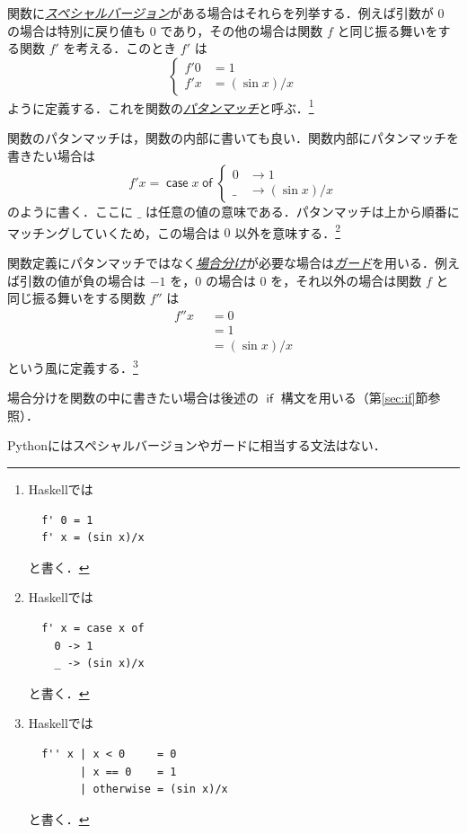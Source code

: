 \documentclass[a4paper]{jsbook}
\newcommand{\programminglanguage}[1]{\textsf{#1}}
\newcommand{\haskell}{\programminglanguage{Haskell}}
\newcommand{\python}{\programminglanguage{Python}}
\newcommand{\keyword}[1]{{\underline{\emph{#1}}}}
\newcommand{\mKeyword}[1]{\mathsf{#1}}
\newcommand{\mIfKeyword}{\mKeyword{if}}
\newcommand{\mCaseKeyword}{\mKeyword{case}}
\newcommand{\mOfKeyword}{\mKeyword{of}}
\newcommand{\mAnyParameter}{\_}
\newcommand{\mGuard}[1]{\mathop{\mid_{#1}}}
\DeclareMathOperator{\mIf}{\mIfKeyword}
\DeclareMathOperator{\mCase}{\mCaseKeyword} %
\DeclareMathOperator{\mOf}{\mOfKeyword} %
\newcommand{\mCaseOf}[1]{\mCase{#1}\mOf}
\newcommand{\mathKeyword}[1]{\operatorname{\textsf{#1}}}
\newcommand{\mathOtherwise}{\mathKeyword{otherwise}}
\begin{document}
関数に\keyword{スペシャルバージョン}がある場合はそれらを列挙する．例えば引数が $0$ の場合は特別に戻り値も $0$ であり，その他の場合は関数 $f$ と同じ振る舞いをする関数 $f'$ を考える．このとき $f'$ は
\begin{equation}
\left\{
\begin{split}
f'0&=1\\
f'x&=(\sin x)/x
\end{split}
\right.
\end{equation}
ように定義する．これを関数の\keyword{パタンマッチ}と呼ぶ．\footnote{\haskell では
\begin{verbatim}
  f' 0 = 1
  f' x = (sin x)/x
\end{verbatim}
と書く．}

関数のパタンマッチは，関数の内部に書いても良い．関数内部にパタンマッチを書きたい場合は
\begin{equation}
f'x=\mCaseOf{x}\left\{
\begin{split}
0&\rightarrow1\\
\mAnyParameter&\rightarrow(\sin x)/x
\end{split}
\right.
\end{equation}
のように書く．ここに $\mAnyParameter$ は任意の値の意味である．パタンマッチは上から順番にマッチングしていくため，この場合は $0$ 以外を意味する．\footnote{\haskell では
\begin{verbatim}
  f' x = case x of
    0 -> 1
    _ -> (sin x)/x
\end{verbatim}
と書く．}

関数定義にパタンマッチではなく\keyword{場合分け}が必要な場合は\keyword{ガード}を用いる．例えば引数の値が負の場合は $-1$ を，$0$ の場合は $0$ を，それ以外の場合は関数 $f$ と同じ振る舞いをする関数 $f''$ は
\begin{equation}
\begin{split}
f''x&\mGuard{x<0}=0\\
&\mGuard{x\equiv 0}=1\\
&\mGuard{\mathOtherwise}=(\sin x)/x
\end{split}
\end{equation}
という風に定義する．\footnote{\haskell では
\begin{verbatim}
  f'' x | x < 0     = 0
        | x == 0    = 1
        | otherwise = (sin x)/x
\end{verbatim}
と書く．}

場合分けを関数の中に書きたい場合は後述の $\mIf$ 構文を用いる（第\ref{sec:if}節参照）．

\python にはスペシャルバージョンやガードに相当する文法はない．
\end{document}
